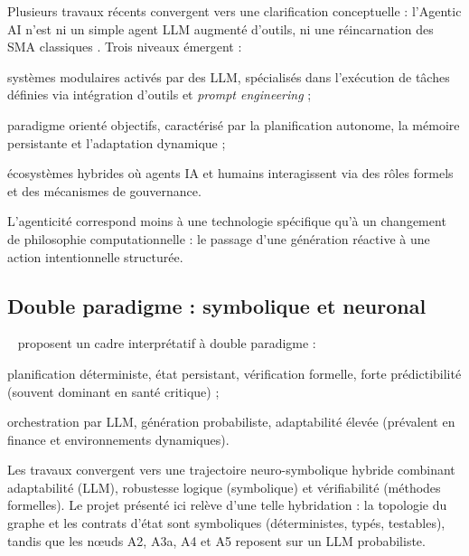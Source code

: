 Plusieurs travaux récents convergent vers une clarification conceptuelle : l'Agentic AI n'est ni un simple agent LLM augmenté d'outils, ni une réincarnation des SMA classiques \cite{sapkota2026,schneider2025,milosevic_rabhi}. Trois niveaux émergent :

\begin{description}[leftmargin=1.4cm,style=nextline]
\item[AI Agents \cite{sapkota2026}] systèmes modulaires activés par des LLM, spécialisés dans l'exécution de tâches définies via intégration d'outils et \emph{prompt engineering} ;
\item[Agentic AI \cite{schneider2025,pati2025}] paradigme orienté objectifs, caractérisé par la planification autonome, la mémoire persistante et l'adaptation dynamique ;
\item[Communautés agentiques \cite{milosevic_rabhi}] écosystèmes hybrides où agents IA et humains interagissent via des rôles formels et des mécanismes de gouvernance.
\end{description}

L'agenticité correspond moins à une technologie spécifique qu'à un changement de philosophie computationnelle : le passage d'une génération réactive à une action intentionnelle structurée.

\subsection{Double paradigme : symbolique et neuronal}

\citeauthor{abouali2026}~\cite{abouali2026} proposent un cadre interprétatif à double paradigme :

\begin{description}[leftmargin=1.4cm,style=nextline]
\item[Paradigme symbolique] planification déterministe, état persistant, vérification formelle, forte prédictibilité (souvent dominant en santé critique) ;
\item[Paradigme neuronal] orchestration par LLM, génération probabiliste, adaptabilité élevée (prévalent en finance et environnements dynamiques).
\end{description}

Les travaux convergent vers une trajectoire neuro-symbolique hybride combinant adaptabilité (LLM), robustesse logique (symbolique) et vérifiabilité (méthodes formelles). Le projet présenté ici relève d'une telle hybridation : la topologie du graphe et les contrats d'état sont symboliques (déterministes, typés, testables), tandis que les nœuds A2, A3a, A4 et A5 reposent sur un LLM probabiliste.

